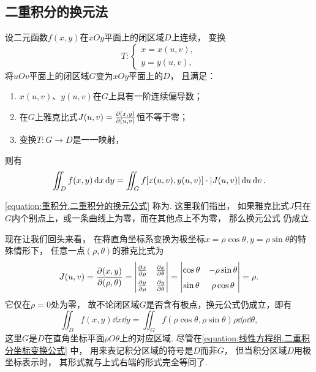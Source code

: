 \subsection{二重积分的换元法}
\begin{theorem}
设二元函数\(f(x,y)\)在\(xOy\)平面上的闭区域\(D\)上连续，
变换\begin{equation*}
	T\colon \left\{ \begin{array}{l}
		x = x(u,v), \\
		y = y(u,v),
	\end{array} \right.
\end{equation*}将\(uOv\)平面上的闭区域\(G\)变为\(xOy\)平面上的\(D\)，
且满足：\begin{enumerate}
	\item \(x(u,v)\)、\(y(u,v)\)在\(G\)上具有一阶连续偏导数；
	\item 在\(G\)上雅克比式\(J(u,v) = \pdv{ (x,y) }{ (u,v) }\)恒不等于零；
	\item 变换\(T\colon G \to D\)是一一映射，
\end{enumerate}
则有\begin{equation}\label{equation:重积分.二重积分的换元公式}
	\iint_D f(x,y) \dd{x} \dd{y}
	= \iint_G f[x(u,v),y(u,v)] \cdot \abs{J(u,v)} \dd{u} \dd{v}.
\end{equation}
\end{theorem}
\cref{equation:重积分.二重积分的换元公式} 称为.
这里我们指出，
如果雅克比式\(J\)只在\(G\)内个别点上，或一条曲线上为零，而在其他点上不为零，
那么换元公式  仍成立.

现在让我们回头来看，
在将直角坐标系变换为极坐标\(x = \rho \cos\theta, y = \rho \sin\theta\)的特殊情形下，
任意一点\((\rho,\theta)\)的雅克比式为\begin{equation*}
	J(u,v)
	= \jacobi{x,y}{\rho,\theta}
	= {\def\arraystretch{1.5} \begin{vmatrix}
		\pdv{x}{\rho} & \pdv{x}{\theta} \\
		\pdv{y}{\rho} & \pdv{y}{\theta}
	\end{vmatrix}}
	= \begin{vmatrix}
		\cos\theta & -\rho \sin\theta \\
		\sin\theta & \rho \cos\theta
	\end{vmatrix}
	= \rho.
\end{equation*}
它仅在\(\rho = 0\)处为零，
故不论闭区域\(G\)是否含有极点，换元公式仍成立，即有\begin{equation*}
	\iint_D f(x,y) \dd{x} \dd{y}
	= \iint_G f(\rho \cos\theta,\rho \sin\theta) \rho \dd{\rho} \dd{\theta},
\end{equation*}
这里\(G\)是\(D\)在直角坐标平面\(\rho O \theta\)上的对应区域.
尽管在\cref{equation:线性方程组.二重积分坐标变换公式} 中，
用来表记积分区域的符号是\(D\)而非\(G\)，
但当积分区域\(D\)用极坐标表示时，
其形式就与上式右端的形式完全等同了.

